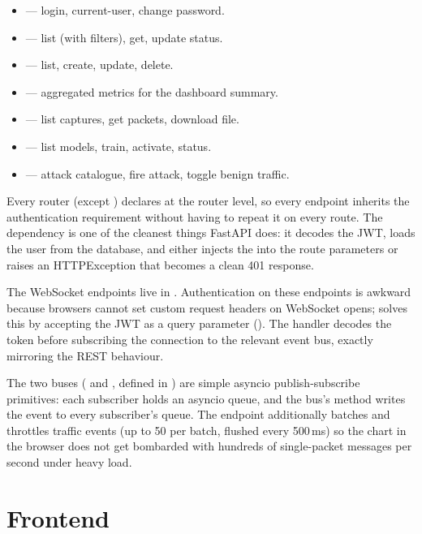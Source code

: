 \begin{itemize}
  \item {} --- login, current-user, change
    password.
  \item {} --- list (with filters), get,
    update status.
  \item {} --- list, create, update, delete.
  \item {} --- aggregated metrics for the
    dashboard summary.
  \item {} --- list captures, get packets,
    download file.
  \item {} --- list models, train, activate, status.
  \item {} --- attack catalogue, fire attack,
    toggle benign traffic.
\end{itemize}

Every router (except ) declares
 at the
router level, so every endpoint inherits the authentication
requirement without having to repeat it on every route. The
dependency is one of the cleanest things FastAPI does: it
decodes the JWT, loads the user from the database, and either
injects the  into the route parameters or raises an
HTTPException that becomes a clean 401 response.

The WebSocket endpoints live in
. Authentication on these
endpoints is awkward because browsers cannot set custom request
headers on WebSocket opens; \nidsname{} solves this by accepting
the JWT as a query parameter ().
The handler decodes the token before subscribing the connection
to the relevant event bus, exactly mirroring the REST behaviour.

The two buses ( and , defined
in ) are simple asyncio
publish-subscribe primitives: each subscriber holds an
asyncio queue, and the bus's  method writes the
event to every subscriber's queue. The 
endpoint additionally batches and throttles traffic events
(up to 50 per batch, flushed every 500\,ms) so the chart in the
browser does not get bombarded with hundreds of single-packet
messages per second under heavy load.

\section{Frontend}
\label{sec:design-frontend}

